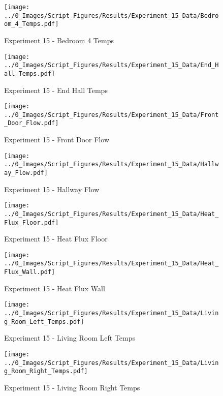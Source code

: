 	\begin{figure}[H]
		\centering
		\texttt{[image: ../0\_Images/Script\_Figures/Results/Experiment\_15\_Data/Bedroom\_4\_Temps.pdf]}
		\caption[]{Experiment 15 - Bedroom 4 Temps}
	\end{figure}
 
	\clearpage

	\begin{figure}[H]
		\centering
		\texttt{[image: ../0\_Images/Script\_Figures/Results/Experiment\_15\_Data/End\_Hall\_Temps.pdf]}
		\caption[]{Experiment 15 - End Hall Temps}
	\end{figure}
 

	\begin{figure}[H]
		\centering
		\texttt{[image: ../0\_Images/Script\_Figures/Results/Experiment\_15\_Data/Front\_Door\_Flow.pdf]}
		\caption[]{Experiment 15 - Front Door Flow}
	\end{figure}
 
	\clearpage

	\begin{figure}[H]
		\centering
		\texttt{[image: ../0\_Images/Script\_Figures/Results/Experiment\_15\_Data/Hallway\_Flow.pdf]}
		\caption[]{Experiment 15 - Hallway Flow}
	\end{figure}
 

	\begin{figure}[H]
		\centering
		\texttt{[image: ../0\_Images/Script\_Figures/Results/Experiment\_15\_Data/Heat\_Flux\_Floor.pdf]}
		\caption[]{Experiment 15 - Heat Flux Floor}
	\end{figure}
 
	\clearpage

	\begin{figure}[H]
		\centering
		\texttt{[image: ../0\_Images/Script\_Figures/Results/Experiment\_15\_Data/Heat\_Flux\_Wall.pdf]}
		\caption[]{Experiment 15 - Heat Flux Wall}
	\end{figure}
 

	\begin{figure}[H]
		\centering
		\texttt{[image: ../0\_Images/Script\_Figures/Results/Experiment\_15\_Data/Living\_Room\_Left\_Temps.pdf]}
		\caption[]{Experiment 15 - Living Room Left Temps}
	\end{figure}
 
	\clearpage

	\begin{figure}[H]
		\centering
		\texttt{[image: ../0\_Images/Script\_Figures/Results/Experiment\_15\_Data/Living\_Room\_Right\_Temps.pdf]}
		\caption[]{Experiment 15 - Living Room Right Temps}
	\end{figure}
 

